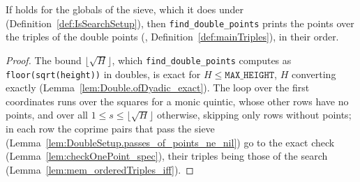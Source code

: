 \begin{lemma}\label{lem:findDoublePoints_spec_of_doubleSetup}
  \leanok
  If  holds for the globals of the sieve, which it does under
   (Definition~\ref{def:IsSearchSetup}), then
  \texttt{find\_double\_points} prints the points over the triples of the double points
  (, Definition~\ref{def:mainTriples}), in their order.
\end{lemma}

\begin{proof}
  \leanok
  The bound $\lfloor \sqrt{H} \rfloor$, which \texttt{find\_double\_points} computes as
  \texttt{floor(sqrt(height))} in doubles, is exact for $H \le \texttt{MAX\_HEIGHT}$, $H$
  converting exactly (Lemma~\ref{lem:Double.ofDyadic_exact}). The loop over the first coordinates
  runs over the squares for a monic quintic, whose other rows have no points, and over all
  $1 \le s \le \lfloor \sqrt{H} \rfloor$ otherwise, skipping only rows without points; in each row
  the coprime pairs that pass the sieve (Lemma~\ref{lem:DoubleSetup.passes_of_points_ne_nil}) go to
  the exact check (Lemma~\ref{lem:checkOnePoint_spec}), their triples being those of the search
  (Lemma~\ref{lem:mem_orderedTriples_iff}).
\end{proof}

